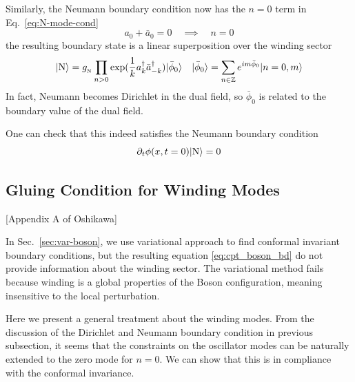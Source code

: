 \documentclass{article}
\begin{document}
Similarly, the Neumann boundary condition now has the $n = 0$ term in Eq.~\ref{eq:N-mode-cond}
\begin{equation}
 a_0 + \bar{a}_0 = 0  \quad \implies \quad n = 0 
\end{equation}
the resulting boundary state is a linear superposition over the winding sector
\begin{equation}
| {\rm N} \rangle = g_{\,\!_\text{N}} \prod_{n > 0 } \exp(\frac{1}{k} a_k^{\dagger} \bar{a}_{-k}^{\dagger} )| \bar{\phi}_0 \rangle \quad | \bar{\phi}_0 \rangle = \sum_{n \in \mathbb{Z}} e^{i m \bar{\phi}_0 } | n = 0, m \rangle 
\end{equation}
In fact, Neumann becomes Dirichlet in the dual field, so $\bar{\phi}_0$ is related to the boundary value of the dual field. 

One can check that this indeed satisfies the Neumann boundary condition
\begin{equation}
\partial_t \phi( x, t = 0 ) | {\rm N } \rangle = 0
\end{equation}


\subsection{Gluing Condition for Winding Modes}
[Appendix A of Oshikawa\cite{oshikawa_boundary_2010}]

In Sec.~\ref{sec:var-boson}, we use variational approach to find conformal invariant boundary conditions, but the resulting equation \eqref{eq:cpt_boson_bd} do not provide information about the winding sector. The variational method fails because winding is a global properties of the Boson configuration, meaning insensitive to the local perturbation. 

Here we present a general treatment about the winding modes. From the discussion of the Dirichlet and Neumann boundary condition in previous subsection, it seems that the constraints on the oscillator modes can be naturally extended to the zero mode for $n = 0$. We can show that this is in compliance with the conformal invariance. 
\end{document}
